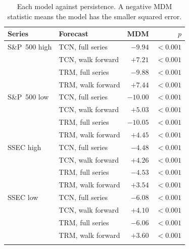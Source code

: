 \begin{table}[ht]
\caption{Each model against persistence. A negative MDM statistic means the model has the smaller squared error.}
\label{tab:dm}
\centering
\begin{tabular}{@{}llrr@{}}
\toprule
Series & Forecast & MDM & $p$ \\
\midrule
S\&P~500 high & TCN, full series & ${-}9.94$ & $<0.001$ \\
 & TCN, walk forward & ${+}7.21$ & $<0.001$ \\
 & TRM, full series & ${-}9.88$ & $<0.001$ \\
 & TRM, walk forward & ${+}7.44$ & $<0.001$ \\
S\&P~500 low & TCN, full series & ${-}10.00$ & $<0.001$ \\
 & TCN, walk forward & ${+}5.03$ & $<0.001$ \\
 & TRM, full series & ${-}10.05$ & $<0.001$ \\
 & TRM, walk forward & ${+}4.45$ & $<0.001$ \\
SSEC high & TCN, full series & ${-}4.48$ & $<0.001$ \\
 & TCN, walk forward & ${+}4.26$ & $<0.001$ \\
 & TRM, full series & ${-}4.53$ & $<0.001$ \\
 & TRM, walk forward & ${+}3.54$ & $<0.001$ \\
SSEC low & TCN, full series & ${-}6.08$ & $<0.001$ \\
 & TCN, walk forward & ${+}4.10$ & $<0.001$ \\
 & TRM, full series & ${-}6.06$ & $<0.001$ \\
 & TRM, walk forward & ${+}3.60$ & $<0.001$ \\
\botrule
\end{tabular}
\end{table}
